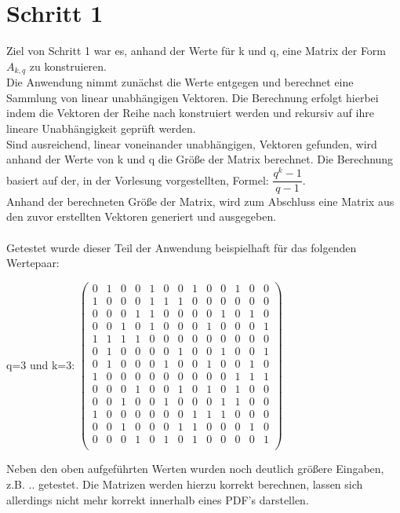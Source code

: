 \section{Schritt 1}
Ziel von Schritt 1 war es, anhand der Werte für k und q, eine Matrix der Form $A_{k,q}$ zu konstruieren. \\
Die Anwendung nimmt zunächst die Werte  entgegen und berechnet eine Sammlung von linear unabhängigen Vektoren. Die Berechnung erfolgt hierbei indem die Vektoren der Reihe nach konstruiert werden und rekursiv auf ihre lineare Unabhängigkeit geprüft werden.\\
Sind ausreichend, linear voneinander unabhängigen, Vektoren gefunden, wird anhand der Werte von k und q die Größe der Matrix berechnet. Die Berechnung basiert auf der, in der Vorlesung vorgestellten, Formel: $\dfrac{q^{k}-1}{q-1}$. \\
Anhand der berechneten Größe der Matrix, wird zum Abschluss eine Matrix aus den zuvor erstellten Vektoren generiert und ausgegeben.\\
\\
Getestet wurde dieser Teil der Anwendung beispielhaft für das folgenden Wertepaar:

\begin{description}
	\item
	q=3 und k=3:			
	$
	\begin{pmatrix}
		0 & 1 & 0 & 0 & 1 & 0 & 0 & 1 & 0 & 0 & 1 & 0 & 0\\
		1 & 0 & 0 & 0 & 1 & 1 & 1 & 0 & 0 & 0 & 0 & 0 & 0\\
		0 & 0 & 0 & 1 & 1 & 0 & 0 & 0 & 0 & 1 & 0 & 1 & 0\\
		0 & 0 & 1 & 0 & 1 & 0 & 0 & 0 & 1 & 0 & 0 & 0 & 1\\
		1 & 1 & 1 & 1 & 0 & 0 & 0 & 0 & 0 & 0 & 0 & 0 & 0\\
		0 & 1 & 0 & 0 & 0 & 0 & 1 & 0 & 0 & 1 & 0 & 0 & 1\\
		0 & 1 & 0 & 0 & 0 & 1 & 0 & 0 & 1 & 0 & 0 & 1 & 0\\
		1 & 0 & 0 & 0 & 0 & 0 & 0 & 0 & 0 & 0 & 1 & 1 & 1\\
		0 & 0 & 0 & 1 & 0 & 0 & 1 & 0 & 1 & 0 & 1 & 0 & 0\\
		0 & 0 & 1 & 0 & 0 & 1 & 0 & 0 & 0 & 1 & 1 & 0 & 0\\
		1 & 0 & 0 & 0 & 0 & 0 & 0 & 1 & 1 & 1 & 0 & 0 & 0\\
		0 & 0 & 1 & 0 & 0 & 0 & 1 & 1 & 0 & 0 & 0 & 1 & 0\\
		0 & 0 & 0 & 1 & 0 & 1 & 0 & 1 & 0 & 0 & 0 & 0 & 1\\
	\end{pmatrix}
	$
\end{description}
Neben den oben aufgeführten Werten wurden noch deutlich größere Eingaben, z.B. .. getestet. Die Matrizen werden hierzu korrekt berechnen, lassen sich allerdings nicht mehr korrekt innerhalb eines PDF's darstellen.